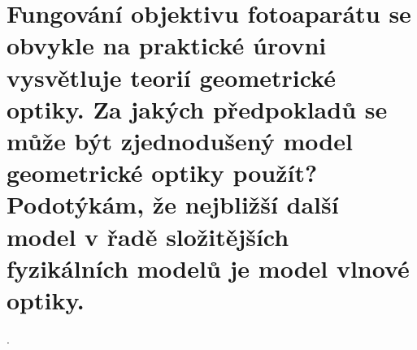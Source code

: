 \section{Fungování objektivu fotoaparátu se obvykle na praktické úrovni vysvětluje teorií geometrické optiky. Za jakých 
předpokladů se může být zjednodušený model geometrické optiky použít? Podotýkám, že nejbližší další model v řadě 
složitějších fyzikálních modelů je model vlnové optiky.}.